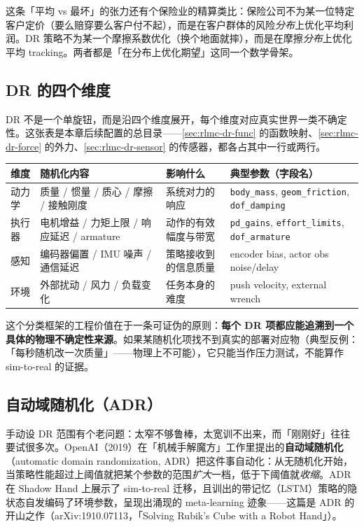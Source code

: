 这条「平均 vs 最坏」的张力还有个保险业的精算类比：保险公司不为某一位特定客户定价（要么赔穿要么客户付不起），而是在客户群体的风险\emph{分布}上优化平均利润。DR 策略不为某一个摩擦系数优化（换个地面就摔），而是在摩擦\emph{分布}上优化平均 tracking。两者都是「在分布上优化期望」这同一个数学骨架。

\subsection{DR 的四个维度}
\label{sec:rlmc-dr-dims}

DR 不是一个单旋钮，而是沿四个维度展开，每个维度对应真实世界一类不确定性。这张表是本章后续配置的总目录——\cref{sec:rlmc-dr-func} 的函数映射、\cref{sec:rlmc-dr-force} 的外力、\cref{sec:rlmc-dr-sensor} 的传感器，都各占其中一行或两行。

\begin{center}
\small
\begin{tabular}{@{}llp{3.4cm}p{4.2cm}@{}}
\toprule
维度 & 随机化内容 & 影响什么 & 典型参数（字段名） \\
\midrule
动力学 & 质量 / 惯量 / 质心 / 摩擦 / 接触刚度 & 系统对力的响应 & \verb|body_mass|, \verb|geom_friction|, \verb|dof_damping| \\
执行器 & 电机增益 / 力矩上限 / 响应延迟 / armature & 动作的有效幅度与带宽 & \verb|pd_gains|, \verb|effort_limits|, \verb|dof_armature| \\
感知 & 编码器偏置 / IMU 噪声 / 通信延迟 & 策略接收到的信息质量 & encoder bias, actor obs noise/delay \\
环境 & 外部扰动 / 风力 / 负载变化 & 任务本身的难度 & push velocity, external wrench \\
\bottomrule
\end{tabular}
\end{center}

这个分类框架的工程价值在于一条可证伪的原则：\textbf{每个 DR 项都应能追溯到一个具体的物理不确定性来源}。如果某随机化项找不到真实的部署对应物（典型反例：「每秒随机改一次质量」——物理上不可能），它只能当作压力测试，不能算作 sim-to-real 的证据。

\subsection{自动域随机化（ADR）}
\label{sec:rlmc-dr-adr}

手动设 DR 范围有个老问题：太窄不够鲁棒，太宽训不出来，而「刚刚好」往往要试很多次。OpenAI（2019）在「机械手解魔方」工作里提出的\textbf{自动域随机化}（automatic domain randomization, ADR）把这件事自动化：从无随机化开始，当策略性能超过上阈值就把某个参数的范围\emph{扩大}一档，低于下阈值就\emph{收缩}。ADR 在 Shadow Hand 上展示了 sim-to-real 迁移，且训出的带记忆（LSTM）策略的隐状态自发编码了环境参数，呈现出涌现的 meta-learning 迹象——这篇是 ADR 的开山之作（arXiv:1910.07113，「Solving Rubik's Cube with a Robot Hand」）\cite{openai2019rubik}。

